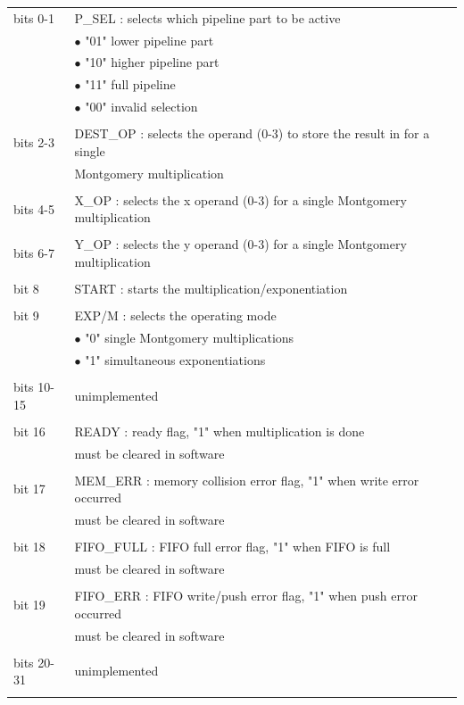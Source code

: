\begin{tabular}{ll}
bits 0-1 	& P\_SEL : selects which pipeline part to be active\\
 			& $\bullet$  "01" lower pipeline part\\
 			& $\bullet$  "10" higher pipeline part\\
 			& $\bullet$  "11" full pipeline\\
 			& $\bullet$  "00" invalid selection\\
 			&\\
bits 2-3 	& DEST\_OP : selects the operand (0-3) to store the result in for a single\\
 			& Montgomery multiplication\footnotemark\\
 			&\\
bits 4-5 	& X\_OP : selects the x operand (0-3) for a single Montgomery multiplication\footnotemark[\value{footnote}]\\
			&\\
bits 6-7 	& Y\_OP : selects the y operand (0-3) for a single Montgomery multiplication\footnotemark[\value{footnote}]\\
			&\\
bit 8 		& START : starts the multiplication/exponentiation\\
			&\\
bit 9 		& EXP/M : selects the operating mode\\
 			& $\bullet$  "0" single Montgomery multiplications\\
 			& $\bullet$  "1" simultaneous exponentiations\\
 			&\\
bits 10-15	& unimplemented\\
			&\\
bit 16		& READY : ready flag, "1" when multiplication is done\\
			& must be cleared in software\\
			&\\
bit 17		& MEM\_ERR : memory collision error flag, "1" when write error occurred\\
			& must be cleared in software\\
			&\\
bit 18		& FIFO\_FULL : FIFO full error flag, "1" when FIFO is full\\
			& must be cleared in software\\
			&\\
bit 19		& FIFO\_ERR : FIFO write/push error flag, "1" when push error occurred\\
			& must be cleared in software\\
			&\\
bits 20-31	& unimplemented\\
			&\\
\end{tabular}
\newline
\newline
{}

